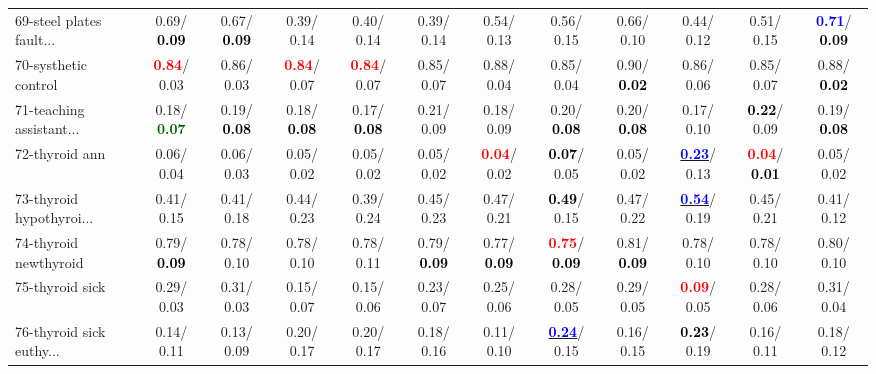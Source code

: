\begin{table}[h]
\begin{center}
{\begin{tabular}{lc|c|c|c|c|c|c|c|c|c|c}
69-steel plates fault... &   0.69/\textcolor{black}{\textbf{  0.09}} &   0.67/\textcolor{black}{\textbf{  0.09}} &   0.39/  0.14 &   0.40/  0.14 &   0.39/  0.14 &   0.54/  0.13 &   0.56/  0.15 &   0.66/  0.10 &   0.44/  0.12 &   0.51/  0.15 & \textcolor{blue}{\textbf{  0.71}}/\textcolor{black}{\textbf{  0.09}} \\
70-systhetic control & \textcolor{red}{\textbf{  0.84}}/  0.03 &   0.86/  0.03 & \textcolor{red}{\textbf{  0.84}}/  0.07 & \textcolor{red}{\textbf{  0.84}}/  0.07 &   0.85/  0.07 &   0.88/  0.04 &   0.85/  0.04 &   0.90/\textcolor{black}{\textbf{  0.02}} &   0.86/  0.06 &   0.85/  0.07 &   0.88/\textcolor{black}{\textbf{  0.02}} \\
71-teaching assistant... &   0.18/\textcolor{darkgreen}{\textbf{  0.07}} &   0.19/\textcolor{black}{\textbf{  0.08}} &   0.18/\textcolor{black}{\textbf{  0.08}} &   0.17/\textcolor{black}{\textbf{  0.08}} &   0.21/  0.09 &   0.18/  0.09 &   0.20/\textcolor{black}{\textbf{  0.08}} &   0.20/\textcolor{black}{\textbf{  0.08}} &   0.17/  0.10 & \textcolor{black}{\textbf{  0.22}}/  0.09 &   0.19/\textcolor{black}{\textbf{  0.08}} \\ \hline
72-thyroid ann &   0.06/  0.04 &   0.06/  0.03 &   0.05/  0.02 &   0.05/  0.02 &   0.05/  0.02 & \textcolor{red}{\textbf{  0.04}}/  0.02 & \textcolor{black}{\textbf{  0.07}}/  0.05 &   0.05/  0.02 & \underline{\textcolor{blue}{\textbf{  0.23}}}/  0.13 & \textcolor{red}{\textbf{  0.04}}/\textcolor{black}{\textbf{  0.01}} &   0.05/  0.02 \\
73-thyroid hypothyroi... &   0.41/  0.15 &   0.41/  0.18 &   0.44/  0.23 &   0.39/  0.24 &   0.45/  0.23 &   0.47/  0.21 & \textcolor{black}{\textbf{  0.49}}/  0.15 &   0.47/  0.22 & \underline{\textcolor{blue}{\textbf{  0.54}}}/  0.19 &   0.45/  0.21 &   0.41/  0.12 \\
74-thyroid newthyroid &   0.79/\textcolor{black}{\textbf{  0.09}} &   0.78/  0.10 &   0.78/  0.10 &   0.78/  0.11 &   0.79/\textcolor{black}{\textbf{  0.09}} &   0.77/\textcolor{black}{\textbf{  0.09}} & \textcolor{red}{\textbf{  0.75}}/\textcolor{black}{\textbf{  0.09}} &   0.81/\textcolor{black}{\textbf{  0.09}} &   0.78/  0.10 &   0.78/  0.10 &   0.80/  0.10 \\
75-thyroid sick &   0.29/  0.03 &   0.31/  0.03 &   0.15/  0.07 &   0.15/  0.06 &   0.23/  0.07 &   0.25/  0.06 &   0.28/  0.05 &   0.29/  0.05 & \textcolor{red}{\textbf{  0.09}}/  0.05 &   0.28/  0.06 &   0.31/  0.04 \\
76-thyroid sick euthy... &   0.14/  0.11 &   0.13/  0.09 &   0.20/  0.17 &   0.20/  0.17 &   0.18/  0.16 &   0.11/  0.10 & \underline{\textcolor{blue}{\textbf{  0.24}}}/  0.15 &   0.16/  0.15 & \textcolor{black}{\textbf{  0.23}}/  0.19 &   0.16/  0.11 &   0.18/  0.12 \\

\end{tabular}}
\end{center}
\end{table}
